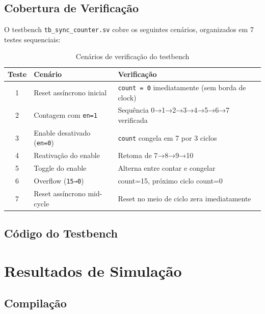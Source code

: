 \documentclass[12pt,a4paper]{article}
\begin{document}
\subsection{Cobertura de Verificação}

O testbench \texttt{tb\_sync\_counter.sv} cobre os seguintes cenários,
organizados em 7 testes sequenciais:

\begin{table}[H]
  \centering
  \caption{Cenários de verificação do testbench}
  \label{tab:testes}
  \begin{tabular}{clp{7cm}}
    \toprule
    \textbf{Teste} & \textbf{Cenário} & \textbf{Verificação} \\
    \midrule
    1 & Reset assíncrono inicial       & \texttt{count = 0} imediatamente (sem borda de clock) \\
    2 & Contagem com \texttt{en=1}     & Sequência 0→1→2→3→4→5→6→7 verificada \\
    3 & Enable desativado (\texttt{en=0}) & \texttt{count} congela em 7 por 3 ciclos \\
    4 & Reativação do enable            & Retoma de 7→8→9→10 \\
    5 & Toggle do enable                & Alterna entre contar e congelar \\
    6 & Overflow (\texttt{15→0})        & count=15, próximo ciclo count=0 \\
    7 & Reset assíncrono mid-cycle      & Reset no meio de ciclo zera imediatamente \\
    \bottomrule
  \end{tabular}
\end{table}

\subsection{Código do Testbench}



\section{Resultados de Simulação}

\subsection{Compilação}
\end{document}
